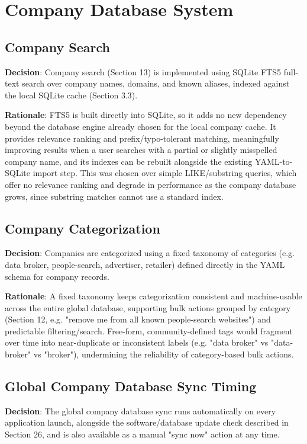 \chapter{Company Database System}

\section{Company Search}
\textbf{Decision}: Company search (Section 13) is implemented using SQLite FTS5 full-text search over company names, domains, and known aliases, indexed against the local SQLite cache (Section 3.3).

\textbf{Rationale}: FTS5 is built directly into SQLite, so it adds no new dependency beyond the database engine already chosen for the local company cache. It provides relevance ranking and prefix/typo-tolerant matching, meaningfully improving results when a user searches with a partial or slightly misspelled company name, and its indexes can be rebuilt alongside the existing YAML-to-SQLite import step. This was chosen over simple LIKE/substring queries, which offer no relevance ranking and degrade in performance as the company database grows, since substring matches cannot use a standard index.
\section{Company Categorization}
\textbf{Decision}: Companies are categorized using a fixed taxonomy of categories (e.g. data broker, people-search, advertiser, retailer) defined directly in the YAML schema for company records.

\textbf{Rationale}: A fixed taxonomy keeps categorization consistent and machine-usable across the entire global database, supporting bulk actions grouped by category (Section 12, e.g. "remove me from all known people-search websites") and predictable filtering/search. Free-form, community-defined tags would fragment over time into near-duplicate or inconsistent labels (e.g. "data broker" vs "data-broker" vs "broker"), undermining the reliability of category-based bulk actions.
\section{Global Company Database Sync Timing}
\textbf{Decision}: The global company database sync runs automatically on every application launch, alongside the software/database update check described in Section 26, and is also available as a manual "sync now" action at any time.

